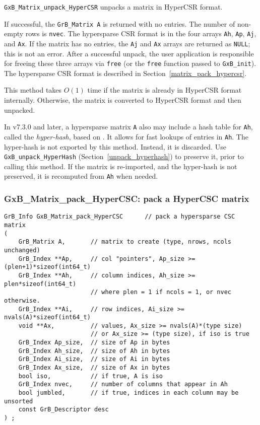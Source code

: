 \documentclass[12pt]{article}
\begin{document}
\verb'GxB_Matrix_unpack_HyperCSR' unpacks a matrix in HyperCSR format.

If successful, the \verb'GrB_Matrix A' is returned with no entries.
The number of non-empty rows is
\verb'nvec'.  The hypersparse CSR format is in the four arrays \verb'Ah',
\verb'Ap', \verb'Aj', and \verb'Ax'.  If the matrix has no entries, the
\verb'Aj' and \verb'Ax' arrays are returned as \verb'NULL'; this is not an
error.  After a successful unpack, the user application is responsible for
freeing these three arrays via \verb'free' (or the \verb'free' function passed
to \verb'GxB_init').  The hypersparse CSR format is described in
Section~\ref{matrix_pack_hypercsr}.

This method takes $O(1)$ time if the matrix is already in HyperCSR format
internally.  Otherwise, the matrix is converted to HyperCSR format and then
unpacked.

In v7.3.0 and later, a hypersparse matrix \verb'A' also may include a hash
table for \verb'Ah', called the {\em hyper-hash}, based on \cite{Green19}.  It
allows for fast lookups of entries in \verb'Ah'.  The hyper-hash is not
exported by this method.  Instead, it is discarded.  Use
\verb'GxB_unpack_HyperHash' (Section~\ref{unpack_hyperhash}) to preserve it,
prior to calling this method.  If the matrix is re-imported, and the hyper-hash
is not preserved, it is recomputed from \verb'Ah' when needed.

\newpage
\subsubsection{{\sf GxB\_Matrix\_pack\_HyperCSC:} pack a HyperCSC matrix}
\label{matrix_pack_hypercsc}

\begin{mdframed}[userdefinedwidth=6in]
{\footnotesize
\begin{verbatim}
GrB_Info GxB_Matrix_pack_HyperCSC      // pack a hypersparse CSC matrix
(
    GrB_Matrix A,       // matrix to create (type, nrows, ncols unchanged)
    GrB_Index **Ap,     // col "pointers", Ap_size >= (plen+1)*sizeof(int64_t)
    GrB_Index **Ah,     // column indices, Ah_size >= plen*sizeof(int64_t)
                        // where plen = 1 if ncols = 1, or nvec otherwise.
    GrB_Index **Ai,     // row indices, Ai_size >= nvals(A)*sizeof(int64_t)
    void **Ax,          // values, Ax_size >= nvals(A)*(type size)
                        // or Ax_size >= (type size), if iso is true
    GrB_Index Ap_size,  // size of Ap in bytes
    GrB_Index Ah_size,  // size of Ah in bytes
    GrB_Index Ai_size,  // size of Ai in bytes
    GrB_Index Ax_size,  // size of Ax in bytes
    bool iso,           // if true, A is iso
    GrB_Index nvec,     // number of columns that appear in Ah
    bool jumbled,       // if true, indices in each column may be unsorted
    const GrB_Descriptor desc
) ;
\end{verbatim}
} \end{mdframed}
\end{document}
